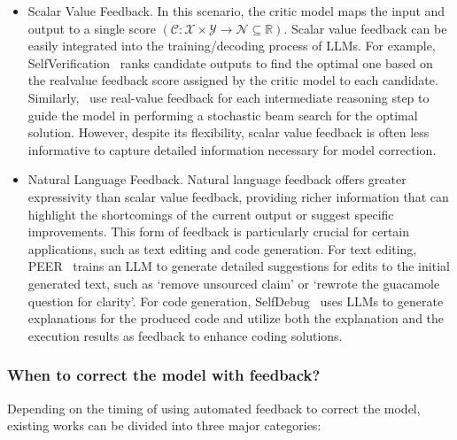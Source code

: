 \documentclass[12pt]{extarticle}
\begin{document}
\begin{itemize}
    \item Scalar Value Feedback. In this scenario, the critic model maps the input and output to a single score $(\mathcal{C}: \mathcal{X} \times \mathcal{Y} \rightarrow \mathcal{N} \subseteq \mathbb{R})$. Scalar value feedback can be easily integrated into the training/decoding process of LLMs. For example, SelfVerification~\cite{weng2023large} ranks candidate outputs to find the optimal one based on the realvalue feedback score assigned by the critic model to each candidate. Similarly,~\cite{xie2023selfevaluation} use real-value feedback for each intermediate reasoning step to guide the model in performing a stochastic beam search for the optimal solution. However, despite its flexibility, scalar value feedback is often less informative to capture detailed information necessary for model correction.

    \item Natural Language Feedback. Natural language feedback offers greater expressivity than scalar value feedback, providing richer information that can highlight the shortcomings of the current output or suggest specific improvements. This form of feedback is particularly crucial for certain applications, such as text editing and code generation. For text editing, PEER~\cite{schick2022peer} trains an LLM to generate detailed suggestions for edits to the initial generated text, such as `remove unsourced claim' or `rewrote the guacamole question for clarity'. For code generation, SelfDebug~\cite{chen2023teaching} uses LLMs to generate explanations for the produced code and utilize both the explanation and the execution results as feedback to enhance coding solutions.
\end{itemize}

\subsubsection{When to correct the model with feedback?}
Depending on the timing of using automated feedback to correct the model, existing works can be divided into three major categories:
\end{document}
